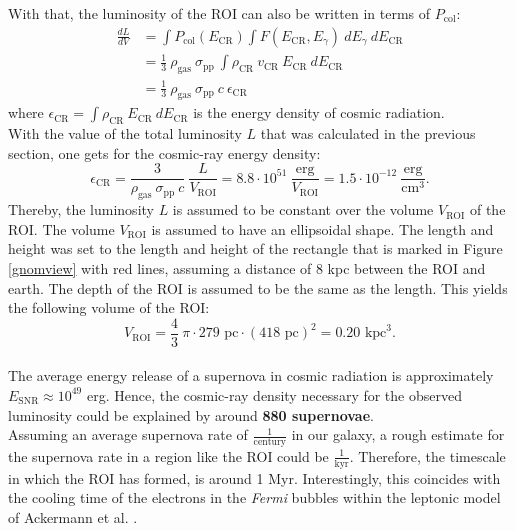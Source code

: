 \documentclass[a4paper]{article}
\begin{document}
With that, the luminosity of the ROI can also be written in terms of $P_\text{col}$:
\begin{equation}
\begin{split}
\frac{dL}{dV} &= \int P_\text{col}(E_{\text{CR}}) \int F(E_{\text{CR}}, E_\gamma)\ dE_\gamma\ dE_{\text{CR}}\\
&= \frac{1}{3}\ \rho_{\text{gas}}\ \sigma_{\text{pp}}\ \int \rho_{\text{CR}}\ v_{\text{CR}}\ E_{\text{CR}}\ dE_{\text{CR}}\\
&= \frac{1}{3}\ \rho_{\text{gas}}\ \sigma_{\text{pp}}\ c\ \epsilon_{\text{CR}}
\end{split}
\end{equation}
where $\epsilon_{\text{CR}} = \int \rho_{\text{CR}}\  E_{\text{CR}}\ dE_{\text{CR}}$ is the energy density of cosmic radiation.\\
With the value of the total luminosity $L$ that was calculated in the previous section, one gets for the cosmic-ray energy density:
\begin{equation}
\label{eq_epsilon}
\epsilon_\text{CR} = \frac{3}{\rho_{\text{gas}}\ \sigma_{\text{pp}}\ c}\ \frac{L}{V_\text{ROI}} = 8.8 \cdot 10^{51}\ \frac{\text{erg}}{V_\text{ROI}} = 1.5\cdot 10^{-12}\ \frac{\text{erg}}{\text{cm}^3}. 
\end{equation} 
Thereby, the luminosity $L$ is assumed to be constant over the volume $V_\text{ROI}$ of the ROI. The volume $V_\text{ROI}$ is assumed to have an ellipsoidal shape. The length and height was set to the length and height of the rectangle that is marked in Figure \ref{gnomview} with red lines, assuming a distance of 8 kpc between the ROI and earth. The depth of the ROI is assumed to be the same as the length. This yields the following volume of the ROI:\\
\begin{equation}
V_\text{ROI} = \frac{4}{3}\ \pi\cdot 279 \text{ pc}\cdot (418 \text{ pc})^2 = 0.20 \text{ kpc}^3.
\end{equation}\\
The average energy release of a supernova in cosmic radiation is approximately $E_\text{SNR} \approx 10 ^{49}$ erg. Hence, the cosmic-ray density necessary for the observed luminosity could be explained by around \textbf{880 supernovae}.\\
Assuming an average supernova rate of $\frac{1}{\text{century}}$ in our galaxy, a rough estimate for the supernova rate in a region like the ROI could be $\frac{1}{\text{kyr}}$. Therefore, the timescale in which the ROI has formed, is around 1 Myr. Interestingly, this coincides with the cooling time of the electrons in the \textit{Fermi} bubbles within the leptonic model of Ackermann et al. \cite{Ackermann1}.\\
\end{document}
